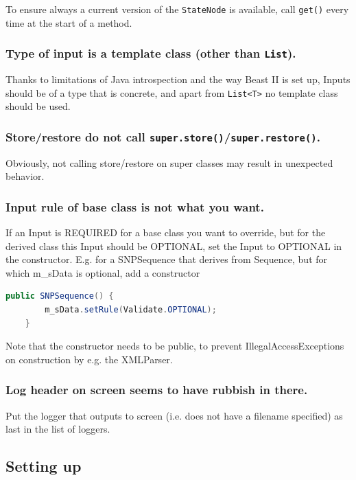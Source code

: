 \documentclass{article}
\begin{document}
To ensure always a current version of the {\tt StateNode} is available, call
{\tt get()} every time at the start of a method.
\fi

\subsubsection{Type of input is a template class (other than {\tt List}).}

Thanks to limitations of Java introspection and the way Beast II is set up, Inputs should be 
of a type that is concrete, and apart from {\tt List<T>} no template class should be used.

\subsubsection{Store/restore do not call {\tt super.store()}/{\tt super.restore()}.}

Obviously, not calling store/restore on super classes may result in unexpected behavior.

\subsubsection{Input rule of base class is not what you want.}

If an Input is REQUIRED for a base class you want to override, but for the derived
class this Input should be OPTIONAL, set the Input to OPTIONAL in the constructor.
E.g. for a SNPSequence that derives from Sequence, but for which m\_sData is optional,
add a constructor

{\color{blue}\begin{lstlisting}[language=java]
	public SNPSequence() {
		m_sData.setRule(Validate.OPTIONAL);
	}
\end{lstlisting}}
Note that the constructor needs to be public, to prevent IllegalAccessExceptions
on construction by e.g. the XMLParser.


\subsubsection{Log header on screen seems to have rubbish in there.}

Put the logger that outputs to screen (i.e. does not have a filename specified)
as last in the list of loggers.

\subsection{Setting up}
\end{document}
